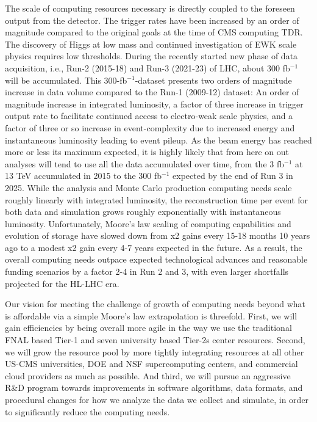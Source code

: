 \documentclass[11pt,a4paper]{article}
\begin{document}
The scale of computing resources necessary is directly coupled to the
foreseen output from the detector.  The trigger rates have been
increased by an order of magnitude compared to the original goals at
the time of CMS computing TDR. The discovery of Higgs at low mass and
continued investigation of EWK scale physics requires low thresholds.
During the recently started new
phase of data acquisition, i.e., Run-2 (2015-18) and Run-3 (2021-23)
of LHC, about 300 fb$^{-1}$ will be accumulated. This
300-fb$^{-1}$-dataset presents two orders of magnitude increase in
data volume compared to the Run-1 (2009-12) dataset: An order of magnitude
increase in integrated luminosity, a factor of three increase in
trigger output rate to facilitate continued access to electro-weak
scale physics, and a factor of three or so increase in
event-complexity due to increased energy and instantaneous luminosity
leading to event pileup.
As the beam energy has reached more or less its maximum expected, it
is highly likely that from here on out analyses will tend to use all
the data accumulated over time, from the 3 fb$^{-1}$ at 13 TeV accumulated in 2015 to
the 300 fb$^{-1}$ expected by the end of Run 3 in 2025.
While the analysis and Monte Carlo production computing needs scale
roughly linearly with integrated luminosity, the reconstruction time
per event for both data and simulation grows roughly exponentially
with instantaneous luminosity.  
Unfortunately, Moore's law scaling of computing capabilities and evolution of
storage have slowed down from x2 gains every 15-18 months 10 years ago to a modest x2 gain every 4-7 years expected in the future.
As a result, the overall computing
needs outpace expected technological advances and reasonable 
funding scenarios by a factor 2-4 in Run 2 and 3, with even larger shortfalls projected for the HL-LHC era.

Our vision for meeting the challenge of growth of computing needs
beyond what is affordable via a simple Moore's law extrapolation is
threefold. First, we will gain efficiencies by being overall more
agile in the way we use the traditional FNAL based Tier-1 and seven
university based Tier-2s center resources. Second, we will grow the
resource pool by more tightly integrating resources at all other
US-CMS universities, DOE and NSF supercomputing centers, and
commercial cloud providers as much as possible. And third, we will
pursue an aggressive R\&D program towards improvements in software
algorithms, data formats, and procedural changes for how we analyze
the data we collect and simulate, in order to significantly reduce the
computing needs.
\end{document}
